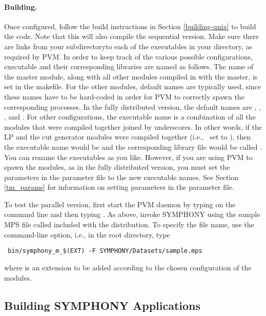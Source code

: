 \paragraph{Building.}

Once configured, follow the build instructions in Section \ref{building-unix}
to build the code. Note that this will also compile the sequential version.
Make sure there are links from your
 subdirectoryto each of the executables in
your  directory, as required by PVM. In order to keep track of
the various possible configurations, executable and their corresponding
libraries are named as follows. The name of the master module, along with all
other modules compiled in with the master, is set in the makefile. For the
other modules, default names are typically used, since these names have to be
hard-coded in order for PVM to correctly spawn the corresponding processes. In
the fully distributed version, the default names are , ,
, and . For other configurations, the executable name is
a combination of all the modules that were compiled together joined by
underscores. In other words, if the LP and the cut generator modules were
compiled together (i.e.,~ set to ), then the executable
name would be  and the corresponding library file would be
called . You can rename the executables as you like.
However, if you are using PVM to spawn the modules, as in the fully
distributed version, you must set the parameters  in the parameter
file to the new executable names. See Section
\ref{tm_params} for information on setting parameters in the parameter file.

To test the parallel version, first start the PVM daemon by typing
 on the command line and then typing . As above,
invoke SYMPHONY using the sample MPS file called  included
with the distribution. To specify the file name, use the 
command-line option, i.e., in the root directory, type
{\color{Brown}
\begin{verbatim}
 bin/symphony_m_$(EXT) -F SYMPHONY/Datasets/sample.mps 
\end{verbatim}
} where  is an extension to be added according to the chosen
configuration of the modules. 

\subsection{Building SYMPHONY Applications}
\label{build_appl}

